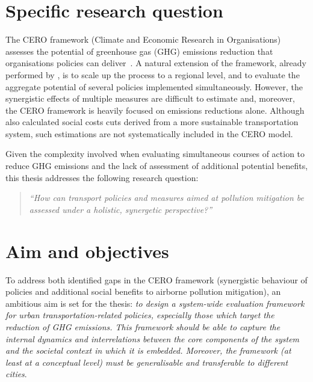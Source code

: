 \section{Specific research question}
\label{s:research-question}
The CERO framework (Climate and Economic Research in Organisations) assesses the potential of greenhouse gas (GHG) emissions reduction that organisations policies can deliver~\parencite{robert2009cero}. A natural extension of the framework, already performed by \textcite{robert2006stockholm2030,robert2016cero-regional}, is to scale up the process to a regional level, and to evaluate the aggregate potential of several policies implemented simultaneously. However, the synergistic effects of multiple measures are difficult to estimate and, moreover, the CERO framework is heavily focused on  emissions reductions alone. Although \textcite{robert2006stockholm2030} also calculated social costs cuts derived from a more sustainable transportation system, such estimations are not systematically included in the CERO model.

Given the complexity involved when evaluating simultaneous courses of action to reduce GHG emissions and the lack of assessment of additional potential benefits, this thesis addresses the following research question:
%
\blockquote{\textit{``How can transport policies and measures aimed at pollution mitigation be assessed under a holistic, synergetic perspective?''}}

\section{Aim and objectives}
\label{s:aim-objectives}
To address both identified gaps in the CERO framework (synergistic behaviour of policies and additional social benefits to airborne pollution mitigation), an ambitious aim is set for the thesis: \textit{to design a system-wide evaluation framework for urban transportation-related policies, especially those which target the reduction of GHG emissions. This framework should be able to capture the internal dynamics and interrelations between the core components of the system and the societal context in which it is embedded. Moreover, the framework (at least at a conceptual level) must be generalisable and transferable to different cities}.

